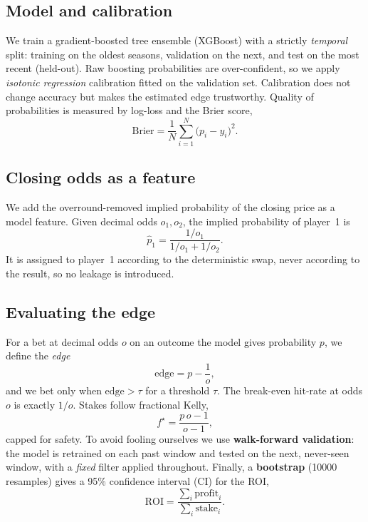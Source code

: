\documentclass[10pt,twocolumn]{article}
\begin{document}
\subsection{Model and calibration}
We train a gradient-boosted tree ensemble (XGBoost) with a strictly
\emph{temporal} split: training on the oldest seasons, validation on the next,
and test on the most recent (held-out). Raw boosting probabilities are
over-confident, so we apply \emph{isotonic regression} calibration fitted on the
validation set. Calibration does not change accuracy but makes the estimated edge
trustworthy. Quality of probabilities is measured by log-loss and the Brier
score,
\begin{equation}
  \mathrm{Brier} = \frac{1}{N}\sum_{i=1}^{N}\big(p_i - y_i\big)^2 .
\end{equation}

\subsection{Closing odds as a feature}
We add the overround-removed implied probability of the closing price as a model
feature. Given decimal odds $o_1,o_2$, the implied probability of player~1 is
\begin{equation}
  \hat{p}_1 = \frac{1/o_1}{1/o_1 + 1/o_2}.
\end{equation}
It is assigned to player~1 according to the deterministic swap, never according
to the result, so no leakage is introduced.

\subsection{Evaluating the edge}
For a bet at decimal odds $o$ on an outcome the model gives probability $p$, we
define the \emph{edge}
\begin{equation}
  \text{edge} = p - \frac{1}{o},
\end{equation}
and we bet only when $\text{edge} > \tau$ for a threshold $\tau$. The break-even
hit-rate at odds $o$ is exactly $1/o$. Stakes follow fractional Kelly,
\begin{equation}
  f^\star = \frac{p\,o - 1}{o - 1},
\end{equation}
capped for safety. To avoid fooling ourselves we use \textbf{walk-forward
validation}: the model is retrained on each past window and tested on the next,
never-seen window, with a \emph{fixed} filter applied throughout. Finally, a
\textbf{bootstrap} (\num{10000} resamples) gives a 95\% confidence interval (CI)
for the ROI,
\begin{equation}
  \text{ROI} = \frac{\sum_i \text{profit}_i}{\sum_i \text{stake}_i}.
\end{equation}
\end{document}
